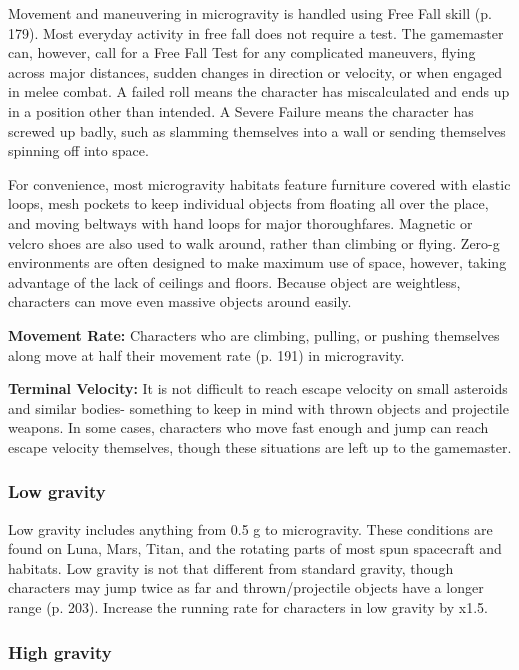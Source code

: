 Movement and maneuvering in microgravity is handled using Free Fall skill (p. 179). Most everyday activity in free fall does not require a test. The gamemaster can, however, call for a Free Fall Test for any complicated maneuvers, flying across major distances, sudden changes in direction or velocity, or when engaged in melee combat. A failed roll means the character has miscalculated and ends up in a position other than intended. A Severe Failure means the character has screwed up badly, such as slamming themselves into a wall or sending themselves spinning off into space. 

For convenience, most microgravity habitats feature furniture covered with elastic loops, mesh pockets to keep individual objects from floating all over the place, and moving beltways with hand loops for major thoroughfares. Magnetic or velcro shoes are also used to walk around, rather than climbing or flying. Zero-g environments are often designed to make maximum use of space, however, taking advantage of the lack of ceilings and floors. Because object are weightless, characters can move even massive objects around easily. 

\textbf{Movement Rate:} Characters who are climbing, pulling, or pushing themselves along move at half their movement rate (p. 191) in microgravity. 

\textbf{Terminal Velocity:} It is not difficult to reach escape velocity on small asteroids and similar bodies- something to keep in mind with thrown objects and projectile weapons. In some cases, characters who move fast enough and jump can reach escape velocity themselves, though these situations are left up to the gamemaster. 

\subsubsection{Low gravity} 

Low gravity includes anything from 0.5 g to microgravity. These conditions are found on Luna, Mars, Titan, and the rotating parts of most spun spacecraft and habitats. Low gravity is not that different from standard gravity, though characters may jump twice as far and thrown/projectile objects have a longer range (p. 203). Increase the running rate for characters in low gravity by x1.5. 

\subsubsection{High gravity} 

